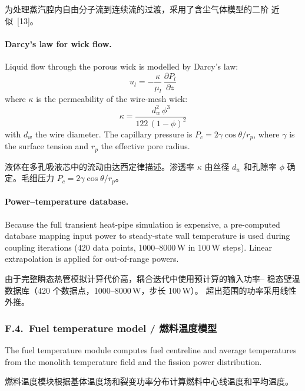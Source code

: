 \documentclass[11pt,a4paper]{article}
\begin{document}
为处理蒸汽腔内自由分子流到连续流的过渡，采用了含尘气体模型的二阶
近似~[13]。

\paragraph{Darcy's law for wick flow.}
Liquid flow through the porous wick is modelled by Darcy's law:
\begin{equation}
u_l = -\frac{\kappa}{\mu_l}\,\frac{\partial P_l}{\partial z}
\end{equation}
where $\kappa$ is the permeability of the wire-mesh wick:
\begin{equation}
\kappa = \frac{d_w^2\,\phi^3}{122\,(1-\phi)^2}
\end{equation}
with $d_w$ the wire diameter. The capillary pressure is
$P_c = 2\gamma\cos\theta / r_p$, where $\gamma$ is the surface tension
and $r_p$ the effective pore radius.

液体在多孔吸液芯中的流动由达西定律描述。渗透率 $\kappa$ 由丝径
$d_w$ 和孔隙率 $\phi$ 确定。毛细压力
$P_c = 2\gamma\cos\theta / r_p$。

\paragraph{Power--temperature database.}
Because the full transient heat-pipe simulation is expensive, a
pre-computed database mapping input power to steady-state wall
temperature is used during coupling iterations (420 data points, 1000--8000\,W
in 100\,W steps). Linear extrapolation is applied for out-of-range
powers.

由于完整瞬态热管模拟计算代价高，耦合迭代中使用预计算的输入功率--
稳态壁温数据库（420 个数据点，1000--8000\,W，步长 100\,W）。
超出范围的功率采用线性外推。


\subsubsection*{F.4.~Fuel temperature model / 燃料温度模型}

The fuel temperature module computes fuel centreline and average
temperatures from the monolith temperature field and the fission power
distribution.

燃料温度模块根据基体温度场和裂变功率分布计算燃料中心线温度和平均温度。
\end{document}
